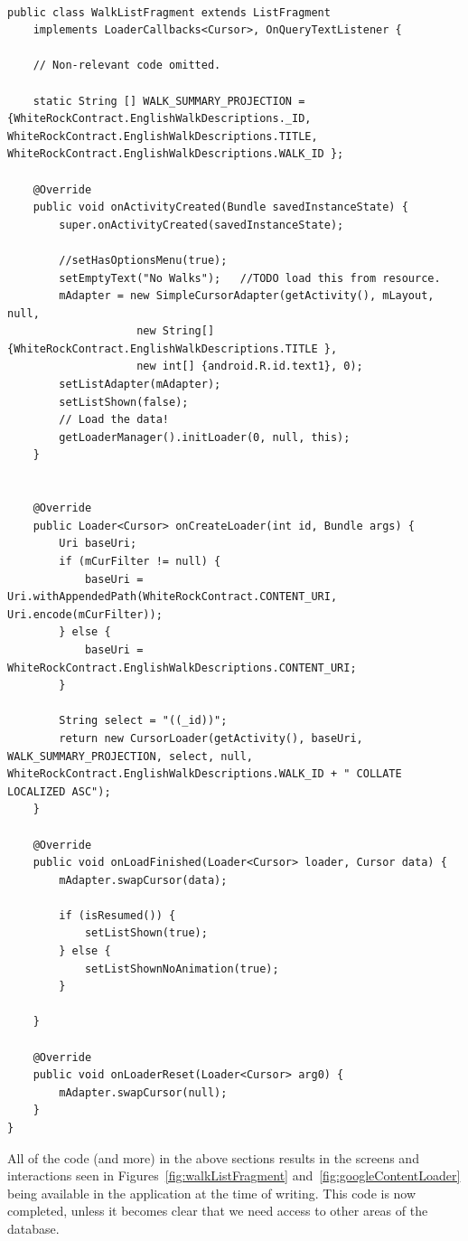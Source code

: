 \documentclass[11pt,a4paper]{article}
\begin{document}
\begin{lstlisting}[captionpos=b, caption=WalkListFragment Snippet, label=lst:walkListFragment, frame=single]

public class WalkListFragment extends ListFragment 
	implements LoaderCallbacks<Cursor>, OnQueryTextListener {

	// Non-relevant code omitted.

	static String [] WALK_SUMMARY_PROJECTION = {WhiteRockContract.EnglishWalkDescriptions._ID, WhiteRockContract.EnglishWalkDescriptions.TITLE, WhiteRockContract.EnglishWalkDescriptions.WALK_ID };
	
	@Override
	public void onActivityCreated(Bundle savedInstanceState) {
		super.onActivityCreated(savedInstanceState);
		
		//setHasOptionsMenu(true);
		setEmptyText("No Walks");	//TODO load this from resource.
		mAdapter = new SimpleCursorAdapter(getActivity(), mLayout, null,
					new String[] {WhiteRockContract.EnglishWalkDescriptions.TITLE },
					new int[] {android.R.id.text1}, 0);	
		setListAdapter(mAdapter);
		setListShown(false);
		// Load the data!
		getLoaderManager().initLoader(0, null, this);
	}

	
	@Override
	public Loader<Cursor> onCreateLoader(int id, Bundle args) {
		Uri baseUri;
		if (mCurFilter != null) {
			baseUri = Uri.withAppendedPath(WhiteRockContract.CONTENT_URI, Uri.encode(mCurFilter));
		} else {
			baseUri = WhiteRockContract.EnglishWalkDescriptions.CONTENT_URI;
		}
		
		String select = "((_id))";
		return new CursorLoader(getActivity(), baseUri, WALK_SUMMARY_PROJECTION, select, null, WhiteRockContract.EnglishWalkDescriptions.WALK_ID + " COLLATE LOCALIZED ASC");
	}

	@Override
	public void onLoadFinished(Loader<Cursor> loader, Cursor data) {
		mAdapter.swapCursor(data);
		
		if (isResumed()) {
			setListShown(true);
		} else {
			setListShownNoAnimation(true);
		}
		
	}

	@Override
	public void onLoaderReset(Loader<Cursor> arg0) {
		mAdapter.swapCursor(null);
	}
}
\end{lstlisting}

All of the code (and more) in the above sections results in the screens and interactions seen in Figures~\ref{fig:walkListFragment} and~\ref{fig:googleContentLoader} being available in the application at the time of writing. This code is now completed, unless it becomes clear that we need access to other areas of the database.
\end{document}

